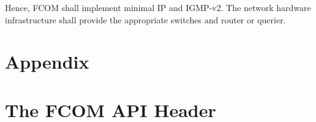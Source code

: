 \documentclass[11pt]{article}
\newcommand{\fcom}{FCOM}
\begin{document}
Hence, \fcom{} shall implement minimal IP and IGMP-v2.
The network hardware infrastructure shall provide the
appropriate switches and router or querier.

\appendix
\pagebreak
\section*{Appendix}

\section{The \fcom{} API Header}
\label{app:api}
%
\lstset{basicstyle=\scriptsize, formfeed=\pagebreak}

\end{document}
